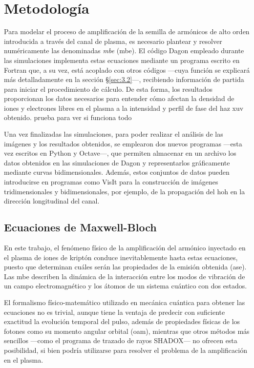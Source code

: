 \chapter{Metodología}\label{cap:3}
Para modelar el proceso de amplificación de la semilla de armónicos de alto orden introducida a través del canal de plasma, es necesario plantear y resolver numéricamente las denominadas \emph{\acrlong{mbe}} (\acrshort{mbe}). El código Dagon empleado durante las simulaciones implementa estas ecuaciones mediante un programa escrito en Fortran que, a su vez, está acoplado con otros códigos ---cuya función se explicará más detalladamente en la sección \S\ref{sec:3.2}---, recibiendo información de partida para iniciar el procedimiento de cálculo. De esta forma, los resultados proporcionan los datos necesarios para entender cómo afectan la densidad de iones y electrones libres en el plasma a la intensidad y perfil de fase del haz \acrshort{xuv} obtenido. prueba para ver si funciona todo

Una vez finalizadas las simulaciones, para poder realizar el análisis de las imágenes y los resultados obtenidos, se emplearon dos nuevos programas ---esta vez escritos en Python y Octave---, que permiten almacenar en un archivo los datos obtenidos en las simulaciones de Dagon y representarlos gráficamente mediante curvas bidimensionales. Además, estos conjuntos de datos pueden introducirse en programas como VisIt para la construcción de imágenes tridimensionales y bidimensionales, por ejemplo, de la propagación del \acrshort{hoh} en la dirección longitudinal del canal.

\section{Ecuaciones de Maxwell-Bloch}\label{sec:3.1}
En este trabajo, el fenómeno físico de la amplificación del armónico inyectado en el plasma de iones de kriptón conduce inevitablemente hasta estas ecuaciones, puesto que determinan cuáles serán las propiedades de la emisión obtenida (\acrshort{ase}). Las \acrshort{mbe} describen la dinámica de la interacción entre los modos de vibración de un campo electromagnético y los átomos de un sistema cuántico con dos estados. 

El formalismo físico-matemático utilizado en mecánica cuántica para obtener las ecuaciones no es trivial\autocite{cohen-tannoudjiQuantumMechanicsVolume2019,cohen-tannoudjiQuantumMechanicsVolume2019a,Sakurai2020,milonniLasers1988}, aunque tiene la ventaja de predecir con suficiente exactitud la evolución temporal del pulso, además de propiedades físicas de los fotones como su momento angular orbital (\acrshort{oam}), mientras que otros métodos más sencillos ---como el programa de trazado de rayos SHADOX--- no ofrecen esta posibilidad, si bien podría utilizarse para resolver el problema de la amplificación en el plasma.

